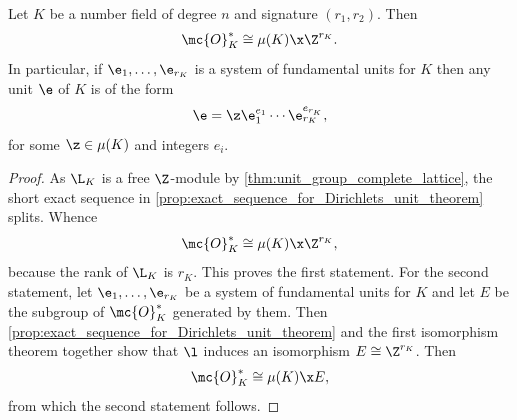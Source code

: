 \documentclass[12pt]{article}
\begin{document}
      \begin{theorem*}
        Let \(K\) be a number field of degree \(n\) and signature \((r_{1},r_{2})\). Then
        \[
          \mc{O}_{K}^{\ast} \cong \mu(K) \x \Z^{r_{K}}.
        \]
        In particular, if \(\e_{1},\ldots,\e_{r_{K}}\) is a system of fundamental units for \(K\) then any unit \(\e\) of \(K\) is of the form
        \[
          \e = \z\e_{1}^{e_{1}} \cdots \e_{r_{K}}^{e_{r_{K}}},
        \]
        for some \(\z \in \mu(K)\) and integers \(e_{i}\).
      \end{theorem*}
      \begin{proof}
        As \(\L_{K}\) is a free \(\Z\)-module by \cref{thm:unit_group_complete_lattice}, the short exact sequence in \cref{prop:exact_sequence_for_Dirichlets_unit_theorem} splits. Whence
        \[
          \mc{O}_{K}^{\ast} \cong \mu(K) \x \Z^{r_{K}},
        \]
        because the rank of \(\L_{K}\) is \(r_{K}\). This proves the first statement. For the second statement, let \(\e_{1},\ldots,\e_{r_{K}}\) be a system of fundamental units for \(K\) and let \(E\) be the subgroup of \(\mc{O}_{K}^{\ast}\) generated by them. Then \cref{prop:exact_sequence_for_Dirichlets_unit_theorem} and the first isomorphism theorem together show that \(\l\) induces an isomorphism \(E \cong \Z^{r_{K}}\). Then
        \[
          \mc{O}_{K}^{\ast} \cong \mu(K) \x E,
        \]
        from which the second statement follows.
      \end{proof}
\end{document}
